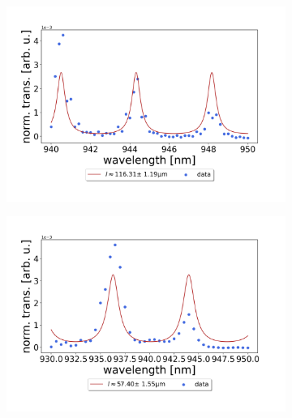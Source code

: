 \begin{figure}[h!]
\begin{subfigure}[b]{0.49\textwidth}
        \includegraphics[width=\textwidth]{figures/results/single fano fits/120um_off_res_fabry_perot.png}
        \caption{}
        \label{fig:120um_off_res_fabry_perot}
    \end{subfigure}
    \begin{subfigure}[b]{0.49\textwidth}
        \includegraphics[width=\textwidth]{figures/results/single fano fits/60um_off_res_fabry_perot.png}
        \caption{}
        \label{fig:60um_off_res_fabry_perot}
    \end{subfigure}
    \begin{subfigure}[b]{0.49\textwidth}

\end{subfigure}
\end{figure}
